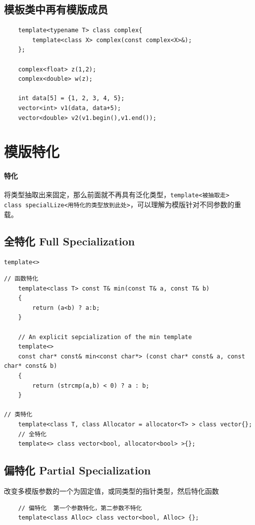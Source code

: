 \documentclass[UTF8,a4paper,12pt]{ctexbook}
\begin{document}
	\subsection{模板类中再有模版成员}
		\begin{lstlisting}
	template<typename T> class complex{
		template<class X> complex(const complex<X>&);
	};
	
	complex<float> z(1,2);
	complex<double> w(z);
	
	int data[5] = {1, 2, 3, 4, 5};
	vector<int> v1(data, data+5);
	vector<double> v2(v1.begin(),v1.end());
		\end{lstlisting}



\section{模版特化}
	\paragraph{特化}将类型抽取出来固定，那么前面就不再具有泛化类型，\verb|template<被抽取走>  class specialLize<用特化的类型放到此处>|，可以理解为模版针对不同参数的重载。
	
	\subsection{全特化 Full Specialization}
		\verb|template<>|
		\begin{lstlisting}
// 函数特化
	template<class T> const T& min(const T& a, const T& b)
	{
		return (a<b) ? a:b;
	}
	
	// An explicit sepcialization of the min template
	template<>
	const char* const& min<const char*> (const char* const& a, const char* const& b)
	{
		return (strcmp(a,b) < 0) ? a : b;
	}
	
// 类特化
	template<class T, class Allocator = allocator<T> > class vector{};
	// 全特化	
	template<> class vector<bool, allocator<bool> >{};	
		\end{lstlisting}
	\subsection{偏特化 Partial Specialization}
		改变多模版参数的一个为固定值，或同类型的指针类型，然后特化函数
		\begin{lstlisting}
	// 偏特化  第一个参数特化，第二参数不特化
	template<class Alloc> class vector<bool, Alloc> {};
		\end{lstlisting}
\end{document}
